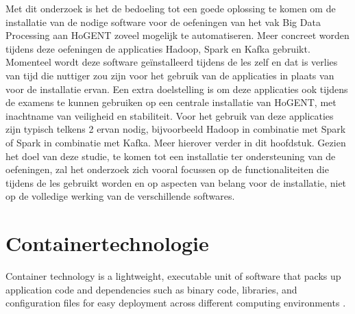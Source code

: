 Met dit onderzoek is het de bedoeling tot een goede oplossing te komen om de installatie van de nodige software voor de oefeningen van het vak Big Data Processing aan HoGENT zoveel mogelijk te automatiseren.
Meer concreet worden tijdens deze oefeningen de applicaties Hadoop, Spark en Kafka gebruikt. Momenteel wordt deze software geïnstalleerd tijdens de les zelf en dat is verlies van tijd die nuttiger zou zijn voor het gebruik van de applicaties in plaats van voor de installatie ervan. 
\newline
\newline
Een extra doelstelling is om deze applicaties ook tijdens de examens te kunnen gebruiken op een centrale installatie van HoGENT, met inachtname van veiligheid en stabiliteit.
\newline
\newline
Voor het gebruik van deze applicaties zijn typisch telkens 2 ervan nodig, bijvoorbeeld Hadoop in combinatie met Spark of Spark in combinatie met Kafka. Meer hierover verder in dit hoofdstuk.
\newline
\newline
Gezien het doel van deze studie, te komen tot een installatie ter ondersteuning van de oefeningen, zal het onderzoek zich vooral focussen op de functionaliteiten die tijdens de les gebruikt worden en op aspecten van belang voor de installatie, niet op de volledige werking van de verschillende softwares.
\newline
\newline

\section{Containertechnologie}
Container technology is a lightweight, executable unit of software that packs up application code and dependencies such as binary code, libraries, and configuration files for easy deployment across different computing environments \autocite{Solarwinds2023}.

